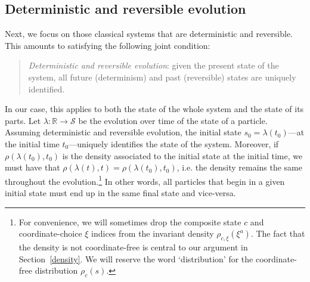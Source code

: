 \documentclass[letterpaper]{article}
\begin{document}
%



\subsection{Deterministic and reversible evolution}
\label{deterministic}

Next, we focus on those classical systems that are deterministic and reversible. This amounts to satisfying the following joint condition:

\begin{quotation}
\noindent
\textit{Deterministic and reversible evolution}: given the present state of the system, all future (determinism) and past (reversible) states are uniquely identified.

\end{quotation}

In our case, this applies to both the state of the whole system and the state of its parts. Let $\lambda: \mathbb{R} \to \mathcal{S}$ be the evolution over time of the state of a particle. Assuming deterministic and reversible evolution, the initial state $s_0 = \lambda(t_0)$---at the initial time $t_0$---uniquely identifies the state of the system. Moreover, if $\rho(\lambda(t_0), t_0)$ is the density associated to the initial state at the initial time, we must have that $\rho(\lambda(t), t) = \rho(\lambda(t_0), t_0)$, i.e. the density remains the same throughout the evolution.\footnote{For convenience, we will sometimes drop the composite state $c$ and coordinate-choice $\xi$ indices from the invariant density $\rho_{c, \xi} (\xi^a)$. The fact that the density is not coordinate-free is central to our argument in Section~\ref{density}. We will reserve the word `distribution' for the coordinate-free distribution $\rho_c (s)$. } In other words, all particles that begin in a given initial state must end up in the same final state and vice-versa.  
\end{document}
